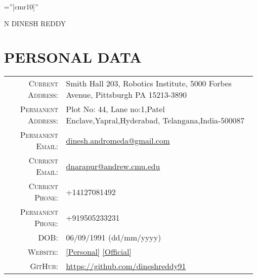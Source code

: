 \documentclass[a4paper,10pt]{article}
\begin{document}

\pagestyle{empty} %

\font\fb=''[cmr10]'' %

\par{\centering
		{\Huge N DINESH \textsc{REDDY}
	}\bigskip\par}

\section{PERSONAL DATA}

\begin{tabular}{rl}

    \textsc{Current Address:}   & Smith Hall 203, Robotics Institute, 5000 Forbes Avenue, Pittsburgh PA 15213-3890  \\
    \textsc{Permanent Address:}   & Plot No: 44, Lane no:1,Patel Enclave,Yapral,Hyderabad, Telangana,India-500087 \\    
    \textsc{Permanent Email:} &  \href{mailto:dinesh.andromeda@gmail.com}{dinesh.andromeda@gmail.com}\\
    \textsc{Current Email:}     & \href{mailto:dnarapur@andrew.cmu.edu}{dnarapur@andrew.cmu.edu}\\
    \textsc{Current Phone:}     & +14127081492 \\
    \textsc{Permanent Phone:}     & +919505233231 \\
    \textsc{DOB:}     & 06/09/1991 (dd/mm/yyyy)\\
    \textsc{Website:}     & \href{http://www.andrew.cmu.edu/user/dnarapur/}{[Personal]} \href{https://ps.is.tuebingen.mpg.de/person/dreddy}{[Official]} \\
    \textsc{GitHub:}     & \href{https://github.com/dineshreddy91}{https://github.com/dineshreddy91}
\end{tabular}


\end{document}
